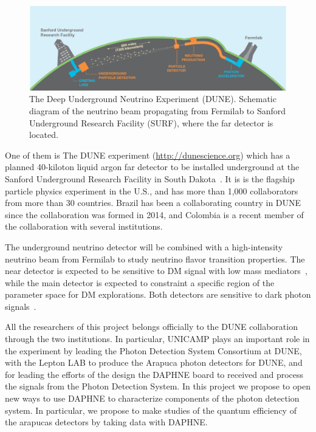 \documentclass[a4paper,10pt,epsfig,epsf,amsfonts,amsmath]{article}
\begin{document}
\begin{ideas}
\begin{figure}[hbtp]
\centering
\includegraphics[width=\textwidth]{fig14.png}
\caption{The Deep Underground Neutrino Experiment (DUNE). Schematic diagram of the neutrino beam propagating from Fermilab to Sanford Underground Research Facility (SURF), where the far detector is located.}
\end{figure}

\end{ideas}

One of them is
The DUNE experiment (\url{http://dunescience.org}) which has a planned
40-kiloton liquid argon far detector to be installed underground at the
Sanford Underground Research Facility in South Dakota~\cite{Abi:2020evt}.
It is is the flagship particle physics experiment in the U.S., and has
more than 1,000 collaborators from more than 30 countries.  Brazil has
been a collaborating country in DUNE since the collaboration was formed in 2014, and Colombia 
is a recent member of the collaboration with several institutions.

The underground
neutrino detector will be combined with a high-intensity neutrino beam
from Fermilab to study neutrino flavor transition properties.
The near detector is expected to be sensitive to DM signal with low
mass mediators~\cite{Coloma:2015pih}, while the main detector is expected to constraint
a specific region of the parameter space for DM explorations.  Both
detectors are sensitive to dark photon signals~\cite{Bertuzzo:2018itn,Bertuzzo:2018ftf,Arguelles:2019xgp,Bakhti:2018avv,Berryman:2019dme,Machado:2019oxb,Cappiello:2019qsw}.


All the researchers of this project belongs officially to the DUNE collaboration through the two institutions. In particular, UNICAMP plays an important role in the experiment
by leading the Photon Detection System Consortium at DUNE, with the Lepton LAB to produce the Arapuca photon detectors for DUNE, and for leading the efforts of the design the DAPHNE board to received and process the signals from the Photon Detection System. In this project we propose to open new ways to use DAPHNE to characterize components of the photon detection system. 
 In particular, we propose to make studies of the quantum efficiency of the arapucas detectors by taking data with DAPHNE.
\end{document}
